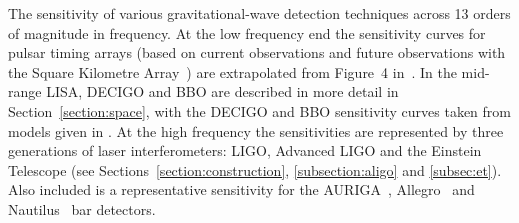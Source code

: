 \label{fig:fullspectrum}
The sensitivity of various gravitational-wave detection
    techniques across 13 orders of magnitude in frequency. At the low
    frequency end the sensitivity curves for pulsar timing arrays
    (based on current observations and future observations with the
    Square Kilometre Array~\cite{SKA}) are extrapolated from Figure~4
    in~\cite{Yardley:2010}. In the mid-range LISA, DECIGO and BBO are
    described in more detail in Section~\ref{section:space}, with the
    DECIGO and BBO sensitivity curves taken from models given in
    \cite{Yagi:2011}. At the high frequency the sensitivities are
    represented by three generations of laser interferometers: LIGO,
    Advanced LIGO and the Einstein Telescope (see
    Sections~\ref{section:construction}, \ref{subsection:aligo} and
    \ref{subsec:et}). Also included is a representative sensitivity
    for the AURIGA~\cite{AURIGA}, Allegro~\cite{Mauceli:1996} and
    Nautilus~\cite{NAUTILUS} bar detectors.
  